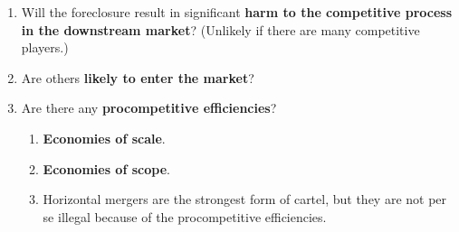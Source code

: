 \begin{enumerate}
\begin{enumerate}
\begin{enumerate}
{            products}:\footnote{p. 22} the merged firm may be able to suppress 
            output and raise the market price.
            \item \textbf{Innovation and product variety}: the merged firm may 
            lose incentives to innovate because it won't need to compete on 
            innovation.
        \end{enumerate}
        \item \textbf{Coordinated effects}.\footnote{p. 24 ff.}
        \begin{enumerate}
            \item Increasing the risk of coordinated anticompetitive behavior.
            \item First: is the market moderately or highly 
            concentrated?\footnote{p. 25.}
            \item Second: is the market vulnerable to coordinated 
            conduct?\footnote{p. 25 ff.}
            \item If yes to both, there is a strong risk of coordinated 
            effects.
        \end{enumerate}
    \end{enumerate}
    \item Will the foreclosure result in significant \textbf{harm to the 
    competitive process in the downstream market}? (Unlikely if there are many 
    competitive players.)
    \item Are others \textbf{likely to enter the market}?
    \item Are there any \textbf{procompetitive efficiencies}?
    \begin{enumerate}
        \item \textbf{Economies of scale}.
        \item \textbf{Economies of scope}.
        \item Horizontal mergers are the strongest form of cartel, but they 
        are not per se illegal because of the procompetitive efficiencies.
    \end{enumerate}
\end{enumerate}
